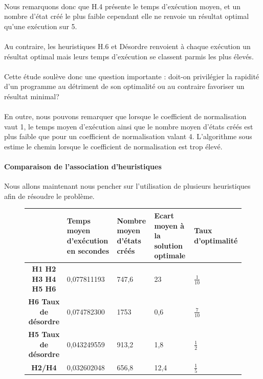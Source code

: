 \documentclass[10pt,a4paper]{report}
\begin{document}
\paragraph{}{Nous remarquons donc que H.4 présente le temps d'exécution moyen, et un nombre d'état créé le plus faible cependant elle ne renvoie un résultat optimal qu'une exécution sur 5.}

\paragraph{}{Au contraire, les heuristiques H.6 et Désordre renvoient à chaque exécution un résultat optimal mais leurs temps d'exécution se classent parmis les plus élevés.}

\paragraph{}{Cette étude soulève donc une question importante : doit-on privilégier la rapidité d'un programme au détriment de son optimalité ou au contraire favoriser un résultat minimal?}

\paragraph{}{En outre, nous pouvons remarquer que lorsque le coefficient de normalisation
vaut 1, le temps moyen d'exécution ainsi que le nombre moyen d'états créés est plus faible 
que pour un coefficient de normalisation valant 4. L'algorithme sous estime le chemin lorsque le coefficient de normalisation est trop élevé.}
\paragraph{Comparaison de l'association d'heuristiques}{Nous allons maintenant nous pencher sur l'utilisation de plusieurs heuristiques afin de résoudre le problème.}

{\scriptsize{}
\renewcommand{\arraystretch}{1.3}
\vspace*{1cm}
\begin{figure}[h!]
\centering
\begin{tabular}
{| c || p{} | p{3cm} | p{3cm} | p{3cm} |} \hline \textbf{ } & \textbf{Temps moyen d'exécution en secondes }&
 \textbf{Nombre moyen d'états créés} & \textbf{Ecart moyen à la solution optimale} &
\textbf{Taux d'optimalité} \\ \hline \hline
\textbf{H1 H2 H3 H4 H5 H6} & 0,077811193 & 747,6 & 23 & $\frac{1}{10}$ \\ \hline
\textbf{H6 Taux de désordre} & 0,074782300 & 1753 & 0,6 & $\frac{7}{10}$   \\ \hline
\textbf{H5 Taux de désordre}& 0,043249559 & 913,2 & 1,8 & $\frac{1}{2}$ \\ \hline
\textbf{H2/H4}&0,032602048&656,8&12,4&$\frac{1}{5}$\\ \hline

\end{tabular}

\end{figure} \vspace*{0,5cm}}
\end{document}
